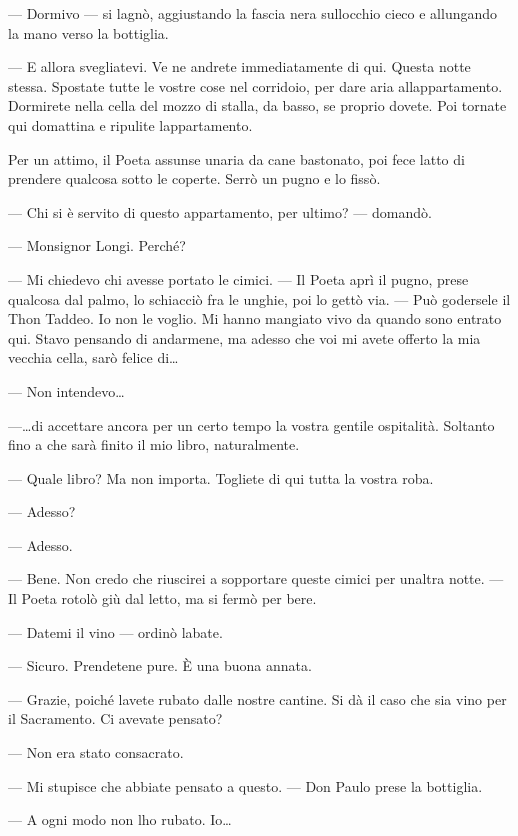 --- Dormivo --- si lagnò, aggiustando la fascia nera
sull\textquotesingle occhio cieco e allungando la mano verso la
bottiglia.

--- E allora svegliatevi. Ve ne andrete immediatamente di qui. Questa
notte stessa. Spostate tutte le vostre cose nel corridoio, per dare aria
all\textquotesingle appartamento. Dormirete nella cella del mozzo di
stalla, da basso, se proprio dovete. Poi tornate qui domattina e
ripulite l\textquotesingle appartamento.

Per un attimo, il Poeta assunse un\textquotesingle aria da cane
bastonato, poi fece l\textquotesingle atto di prendere qualcosa sotto le
coperte. Serrò un pugno e lo fissò.

--- Chi si è servito di questo appartamento, per ultimo? --- domandò.

--- Monsignor Longi. Perché?

--- Mi chiedevo chi avesse portato le cimici. --- Il Poeta aprì il
pugno, prese qualcosa dal palmo, lo schiacciò fra le unghie, poi lo
gettò via. --- Può godersele il Thon Taddeo. Io non le voglio. Mi hanno
mangiato vivo da quando sono entrato qui. Stavo pensando di andarmene,
ma adesso che voi mi avete offerto la mia vecchia cella, sarò felice
di\ldots{}

--- Non intendevo\ldots{}

---\ldots di accettare ancora per un certo tempo la vostra gentile
ospitalità. Soltanto fino a che sarà finito il mio libro, naturalmente.

--- Quale libro? Ma non importa. Togliete di qui tutta la vostra roba.

--- Adesso?

--- Adesso.

--- Bene. Non credo che riuscirei a sopportare queste cimici per
un\textquotesingle altra notte. --- Il Poeta rotolò giù dal letto, ma si
fermò per bere.

--- Datemi il vino --- ordinò l\textquotesingle abate.

--- Sicuro. Prendetene pure. È una buona annata.

--- Grazie, poiché l\textquotesingle avete rubato dalle nostre cantine.
Si dà il caso che sia vino per il Sacramento. Ci avevate pensato?

--- Non era stato consacrato.

--- Mi stupisce che abbiate pensato a questo. --- Don Paulo prese la
bottiglia.

--- A ogni modo non l\textquotesingle ho rubato. Io\ldots{}

